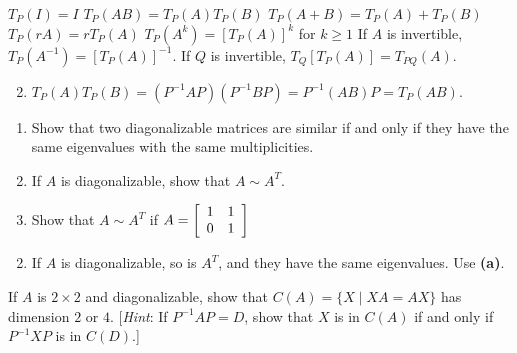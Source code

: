 \begin{multicols}{2}
\begin{ex}
\begin{exenumerate}
\exitem $T_{P}(I) = I$
\exitem $T_{P}(AB) = T_{P}(A)T_{P}(B)$
\exitem $T_{P}(A + B) = T_{P}(A) + T_{P}(B)$
\exitem $T_{P}(rA) = rT_{P}(A)$
\exitem* $T_{P}(A^{k}) = [T_{P}(A)]^{k}$ for $k \geq 1$
\exitem* If $A$ is invertible, $T_{P}(A^{-1}) = [T_{P}(A)]^{-1}$.
\exitem* If $Q$ is invertible, $T_{Q}[T_{P}(A)] = T_{PQ}(A)$.
\end{exenumerate}
\begin{sol}
\begin{enumerate}[label={\alph*.}]
\setcounter{enumi}{1}
\item  $T_{P}(A)T_{P}(B) = (P^{-1}AP)(P^{-1}BP) = P^{-1}(AB)P = T_{P}(AB)$.

\end{enumerate}
\end{sol}
\end{ex}

\begin{ex}
\begin{enumerate}[label={\alph*.}]
\item Show that two diagonalizable matrices are similar if and only if they have the same eigenvalues with the same multiplicities.

\item If $A$ is diagonalizable, show that $A \sim A^{T}$.

\item Show that $A \sim A^{T}$ if 
 $A = \left[ \begin{array}{rr}
 1 & 1 \\
 0 & 1
 \end{array} \right] $

\end{enumerate}
\begin{sol}
\begin{enumerate}[label={\alph*.}]
\setcounter{enumi}{1}
\item  If $A$ is diagonalizable, so is $A^{T}$, and they have the same eigenvalues. Use \textbf{(a)}.

\end{enumerate}
\end{sol}
\end{ex}

\begin{ex}
If $A$ is $2 \times 2$ and diagonalizable, show that $C(A) = \{X \mid XA = AX\}$ has dimension $2$ or $4$. [\textit{Hint}: If $P^{-1}AP = D$, show that $X$ is in $C(A)$ if and only if $P^{-1}XP$ is in $C(D)$.]
\end{ex}


\end{multicols}
